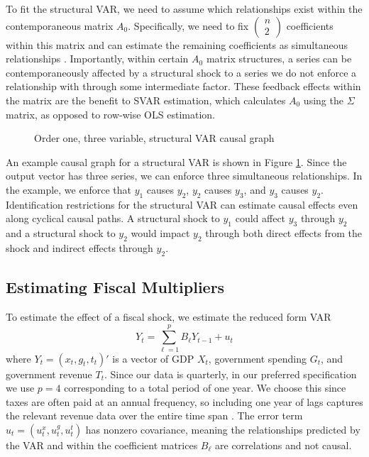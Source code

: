 To fit the structural VAR, we need to assume which relationships exist within the contemporaneous matrix $A_0$. Specifically, we need to fix $\begin{pmatrix} n \\ 2 \end{pmatrix}$ coefficients within this matrix and can estimate the remaining coefficients as simultaneous relationships \parencite{neusser2016time}. Importantly, within certain $A_0$ matrix structures, a series can be contemporaneously affected by a structural shock to a series we do not enforce a relationship with through some intermediate factor. These feedback effects within the matrix are the benefit to SVAR estimation, which calculates $A_0$ using the $\Sigma$ matrix, as opposed to row-wise OLS estimation.

\begin{figure}[t!]
    \centering
    \caption{Order one, three variable, structural VAR causal graph}
    
    \label{fig:svar-graph}
\end{figure}

An example causal graph for a structural VAR is shown in Figure \ref{fig:svar-graph}. Since the output vector has three series, we can enforce three simultaneous relationships. In the example, we enforce that $y_1$ causes $y_2$, $y_2$ causes $y_3$, and $y_3$ causes $y_2$. Identification restrictions for the structural VAR can estimate causal effects even along cyclical causal paths. A structural shock to $y_1$ could affect $y_3$ through $y_2$ and a structural shock to $y_2$ would impact $y_2$ through both direct effects from the shock and indirect effects through $y_2$.


\subsection{Estimating Fiscal Multipliers}

To estimate the effect of a fiscal shock, we estimate the reduced form VAR
\[
    Y_t = \sum_{\ell = 1}^p B_\ell Y_{t - 1} + u_t
\]
where $Y_t = (x_t, g_t, t_t)'$ is a vector of GDP $X_t$, government spending $G_t$, and government revenue $T_t$. Since our data is quarterly, in our preferred specification we use $p = 4$ corresponding to a total period of one year. We choose this since taxes are often paid at an annual frequency, so including one year of lags captures the relevant revenue data over the entire time span \parencite{blanchard2002empirical}. The error term $u_t = (u_t^x, u_t^g, u_t^t)$ has nonzero covariance, meaning the relationships predicted by the VAR and within the coefficient matrices $B_\ell$ are correlations and not causal.

